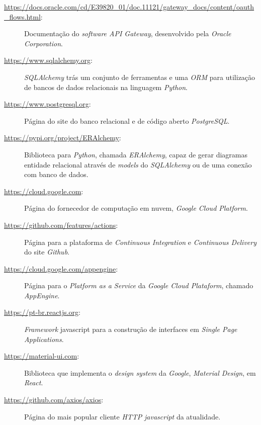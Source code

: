 \begin{description}
    \label{link:oauth}
    \item[\url{https://docs.oracle.com/cd/E39820_01/doc.11121/gateway_docs/content/oauth_flows.html}:]
Documentação do \emph{software API Gateway}, desenvolvido pela \emph{Oracle Corporation}.

\label{link:sqlalchemy}
\item[\url{https://www.sqlalchemy.org}:] \emph{SQLAlchemy} trás um 
  conjunto de ferramentas e uma \emph{ORM} para utilização de bancos de dados relacionais 
  na linguagem \emph{Python}.

  \label{link:postgresql}
\item[\url{https://www.postgresql.org}:] Página do site do banco relacional e de código aberto 
  \emph{PostgreSQL}.
  


\label{link:eralchemy}
\item[\url{https://pypi.org/project/ERAlchemy}:] Biblioteca para \emph{Python}, chamada \emph{ERAlchemy}, 
  capaz de gerar diagramas entidade relacional através de \emph{models} do \emph{SQLAlchemy} ou de uma conexão 
  com banco de dados.

  \label{link:gcp}
\item[\url{https://cloud.google.com}:] Página do fornecedor de computação em nuvem, \emph{Google 
    Cloud Platform}.

  \label{link:actions}
\item[\url{https://github.com/features/actions}:] Página para a plataforma de \emph{Continuous Integration}
    e \emph{Continuous Delivery} do site \emph{Github}.

    \label{link:appengine}
\item[\url{https://cloud.google.com/appengine}:] Página para o \emph{Platform as a Service} da 
  \emph{Google Cloud Plataform}, chamado \emph{AppEngine}.

  \label{link:react}
\item[\url{https://pt-br.reactjs.org}:] \emph{Framework} javascript para a construção 
  de interfaces em \emph{Single Page Applications}.

  \label{link:mui}
\item[\url{https://material-ui.com}:] Biblioteca que implementa o \emph{design system} da 
  \emph{Google}, \emph{Material Design}, em \emph{React}.

  \label{link:axios}
\item[\url{https://github.com/axios/axios}:] Página do mais popular cliente \emph{HTTP} 
  \emph{javascript} da atualidade.


\end{description}
